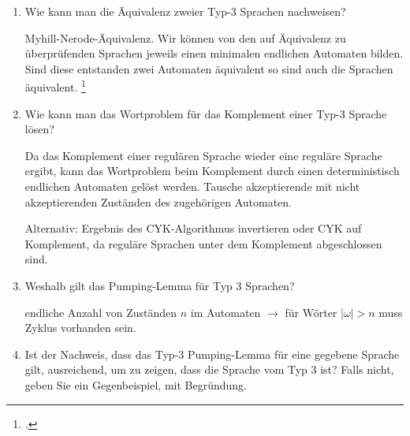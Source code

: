 \documentclass{bschlangaul-aufgabe}
\begin{document}
\begin{enumerate}
\begin{bAntwort}

\begin{bProduktionsRegeln}
S -> A A,
S -> B B,
A -> a,
B -> a,
\end{bProduktionsRegeln}


\footcite{wiki:mehrdeutig}
\end{bAntwort}


\item Wie kann man die Äquivalenz zweier Typ-3 Sprachen nachweisen?


\begin{bAntwort}
Myhill-Nerode-Äquivalenz. Wir können von den auf Äquivalenz zu
überprüfenden Sprachen jeweils einen minimalen endlichen Automaten
bilden. Sind diese entstanden zwei Automaten äquivalent so sind auch die
Sprachen äquivalent.
\footcite{wiki:aequivalenzproblem}
\end{bAntwort}


\item Wie kann man das Wortproblem für das Komplement einer Typ-3
Sprache lösen?


\begin{bAntwort}
Da das Komplement einer regulären Sprache wieder eine reguläre Sprache
ergibt, kann das Wortproblem beim Komplement durch einen deterministisch
endlichen Automaten gelöst werden. Tausche akzeptierende mit nicht
akzeptierenden Zuständen des zugehörigen Automaten.

Alternativ: Ergebnis des CYK-Algorithmus invertieren oder CYK auf
Komplement, da reguläre Sprachen unter dem Komplement abgeschlossen
sind.
\end{bAntwort}


\item Weshalb gilt das Pumping-Lemma für Typ 3 Sprachen?

\begin{bAntwort}
endliche Anzahl von Zuständen $n$ im Automaten $\rightarrow$ für Wörter
$|\omega| > n$ muss Zyklus vorhanden sein.
\end{bAntwort}


\item Ist der Nachweis, dass das Typ-3 Pumping-Lemma für eine gegebene
Sprache gilt, ausreichend, um zu zeigen, dass die Sprache vom Typ 3 ist?
Falls nicht, geben Sie ein Gegenbeispiel, mit Begründung.


\end{enumerate}
\end{document}
